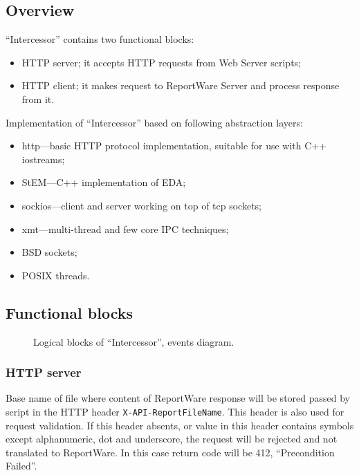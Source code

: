 \documentclass[a4paper,twoside]{article}
\newcommand{\Inter}{{\fontseries{b}\selectfont ``Intercessor''}}
\begin{document}
\subsection{Overview}

\Inter{} contains two functional blocks:
\begin{itemize}
  \item HTTP server; it accepts HTTP requests from Web Server scripts;
  \item HTTP client; it makes request to ReportWare Server and process response from it.
\end{itemize}


Implementation of \Inter{} based on following abstraction layers:
\begin{itemize}
  \item http---basic HTTP protocol implementation, suitable for use with C{+}{+} iostreams;
  \item StEM---C{+}{+} implementation of EDA;
  \item sockios---client and server working on top of tcp sockets;
  \item xmt---multi-thread and few core IPC techniques;
  \item BSD sockets;
  \item POSIX threads.
\end{itemize}

\subsection{Functional blocks}

\begin{figure}
\begin{center}
\end{center}
\caption{Logical blocks of \Inter{}, events diagram.\label{IntercessorEventsDiagram}}
\end{figure}

\subsubsection{HTTP server\label{HTTPsrv}}

Base name of file where content of ReportWare response will be stored
passed by script in the HTTP header \verb|X-API-ReportFileName|.
This header is also used for request validation. If this header absents,
or value in this header contains symbols except alphanumeric, dot and
underscore, the request will be rejected and not translated to ReportWare.
In this case return code will be 412, ``Precondition Failed''.
\end{document}
